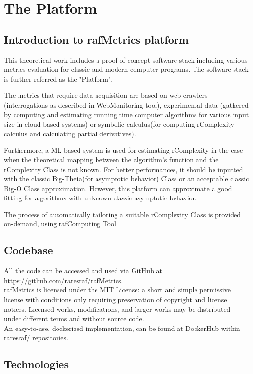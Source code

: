 \chapter{The Platform}


\section{Introduction to rafMetrics platform}
This theoretical work includes a proof-of-concept software stack including various metrics evaluation for classic and modern computer programs. The software stack is further referred as the "Platform".

The metrics that require data acquisition are based on web crawlers (interrogations as described in WebMonitoring tool), experimental data (gathered by computing and estimating running time computer algorithms for various input size in cloud-based systems) or symbolic calculus(for computing rComplexity calculus and calculating partial derivatives).

Furthermore, a ML-based system is used for estimating rComplexity in the case when the theoretical mapping between the algorithm's function and the rComplexity Class is not known. For better performances, it should be inputted with the classic Big-Theta(for asymptotic behavior) Class or an acceptable classic Big-O Class approximation. However, this platform can approximate a good fitting for algorithms with unknown classic asymptotic behavior. 

The process of automatically tailoring a suitable rComplexity Class is provided on-demand, using rafComputing Tool.




\section{Codebase}
All the code can be accessed and used via GitHub at \href{https://github.com/raresraf/rafMetrics}{https://github.com/raresraf/rafMetrics}.
\\
rafMetrics is licensed under the MIT License: a short and simple permissive license with conditions only requiring preservation of copyright and license notices. Licensed works, modifications, and larger works may be distributed under different terms and without source code.
\\
An easy-to-use, dockerized implementation, can be found at DockerHub within raresraf/ repositories.


\section{Technologies}

